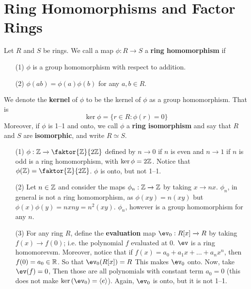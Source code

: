 \section{Ring Homomorphisms and Factor Rings}
\label{section_5.3}

\begin{definition}
  Let $R$ and  $S$ be rings. We call a map  $\phi:R \xrightarrow{} S$ a
  \textbf{ring homomorphism} if
  \begin{enumerate}
    \item[(1)] $\phi$ is a group homomorphism with respect to addition.

    \item[(2)] $\phi(ab)=\phi(a)\phi(b)$ for any $a,b \in R$.
  \end{enumerate}
  We denote the \textbf{kernel} of $\phi$ to be the kernel of $\phi$ as a
  group homomorphism. That is
  \begin{equation*}
    \ker{\phi}=\{r \in R : \phi(r)=0\}
  \end{equation*}
  Moreover, if $\phi$ is 1--1 and onto, we call $\phi$ a \textbf{ring
  isomorphism} and say that $R$ and $S$ are \textbf{isomorphic},
  and write $R \simeq S$.
\end{definition}

\begin{example}\label{example_5.9}
  \begin{enumerate}
    \item[(1)] $\phi:\Z \xrightarrow{} \faktor{\Z}{2\Z}$ defined by $n
      \xrightarrow{} 0$ if $n$ is even and  $n \xrightarrow{} 1$ if $n$ is
      odd is a ring homomorphism, with  $\ker{\phi}=2\mathbb{Z}$. Notice that
      $\phi(\Z)=\faktor{\Z}{2\Z}$. $\phi$ is onto, but not 1--1.

    \item[(2)] Let $n \in \mathbb{Z}$ and consider the maps  $\phi_n:\mathbb{Z}
      \xrightarrow{} \mathbb{Z}$ by taking $x \xrightarrow{} nx$. $\phi_n$, in
      general is not a ring homomorphism, as  $\phi(xy)=n(xy)$ but
      $\phi(x)\phi(y)=nxny=n^2(xy)$. $\phi_n$, however is a group
      homomorphism for any $n$.

    \item[(3)] For any ring $R$, define the \textbf{evaluation} map
      $\ev_0:R[x] \xrightarrow{} R$ by taking $f(x) \xrightarrow{} f(0)$;
      i.e. the polynomial $f$ evaluated at $0$.  $\ev$ is a ring
      homomorevsm. Moreover, notice that if
      $f(x)=a_0+a_1x+\dots+a_nx^n$, then $f(0)=a_0 \in \mathbb{R}$. So that
      $\ev_0(R[x])=R$ This makes $\ev_0$ onto. Now, take  $\ev(f)=0$, Then
      those are all polynomials with constant term $a_0=0$ (this does not
      make $\ker{(\ev_0)}=\langle e \rangle$). Again, $\ev_0$ is onto, but it
      is not 1--1.
  \end{enumerate}
\end{example}

